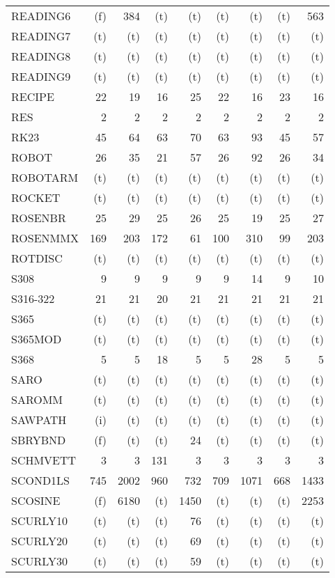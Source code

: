 \documentclass[11pt,twoside]{article}
\begin{document}
{\begin{longtable}[c]{|l|r|r|r|r|r|r|r|r|}
 READING6 & (f) & 384 & (t) & (t) & (t) & (t) & (t) & 563 \\
 READING7 & (t) & (t) & (t) & (t) & (t) & (t) & (t) & (t) \\
 READING8 & (t) & (t) & (t) & (t) & (t) & (t) & (t) & (t) \\
 READING9 & (t) & (t) & (t) & (t) & (t) & (t) & (t) & (t) \\
 RECIPE & 22 & 19 & 16 & 25 & 22 & 16 & 23 & 16 \\
 RES & 2 & 2 & 2 & 2 & 2 & 2 & 2 & 2 \\
 RK23 & 45 & 64 & 63 & 70 & 63 & 93 & 45 & 57 \\
 ROBOT & 26 & 35 & 21 & 57 & 26 & 92 & 26 & 34 \\
 ROBOTARM & (t) & (t) & (t) & (t) & (t) & (t) & (t) & (t) \\
 ROCKET & (t) & (t) & (t) & (t) & (t) & (t) & (t) & (t) \\
 ROSENBR & 25 & 29 & 25 & 26 & 25 & 19 & 25 & 27 \\
 ROSENMMX & 169 & 203 & 172 & 61 & 100 & 310 & 99 & 203 \\
 ROTDISC & (t) & (t) & (t) & (t) & (t) & (t) & (t) & (t) \\
 S308 & 9 & 9 & 9 & 9 & 9 & 14 & 9 & 10 \\
 S316-322 & 21 & 21 & 20 & 21 & 21 & 21 & 21 & 21 \\
 S365 & (t) & (t) & (t) & (t) & (t) & (t) & (t) & (t) \\
 S365MOD & (t) & (t) & (t) & (t) & (t) & (t) & (t) & (t) \\
 S368 & 5 & 5 & 18 & 5 & 5 & 28 & 5 & 5 \\
 SARO & (t) & (t) & (t) & (t) & (t) & (t) & (t) & (t) \\
 SAROMM & (t) & (t) & (t) & (t) & (t) & (t) & (t) & (t) \\
 SAWPATH & (i) & (t) & (t) & (t) & (t) & (t) & (t) & (t) \\
 SBRYBND & (f) & (t) & (t) & 24 & (t) & (t) & (t) & (t) \\
 SCHMVETT & 3 & 3 & 131 & 3 & 3 & 3 & 3 & 3 \\
 SCOND1LS & 745 & 2002 & 960 & 732 & 709 & 1071 & 668 & 1433 \\
 SCOSINE & (f) & 6180 & (t) & 1450 & (t) & (t) & (t) & 2253 \\
 SCURLY10 & (t) & (t) & (t) & 76 & (t) & (t) & (t) & (t) \\
 SCURLY20 & (t) & (t) & (t) & 69 & (t) & (t) & (t) & (t) \\
 SCURLY30 & (t) & (t) & (t) & 59 & (t) & (t) & (t) & (t) \\

\end{longtable}}
\end{document}
